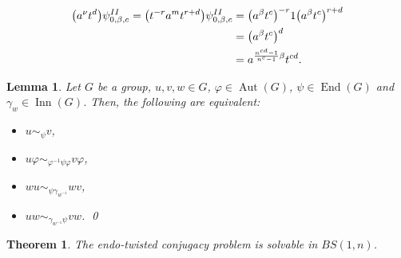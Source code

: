 \documentclass[10pt,a4paper]{amsart}
\newtheorem{lem}{Lemma}
\newtheorem{thm}{Theorem}
\newcommand{\Aut}{\operatorname{Aut}}
\newcommand{\End}{\operatorname{End}}
\newcommand{\Inn}{\operatorname{Inn}}
\begin{document}
  \begin{align}\label{eq: action II}
\big( a^{\nu}t^d \big) \psi^{II}_{0,\beta, c} = \big( t^{-r}a^{m}t^{r+d}\big) \psi^{II}_{0,\beta, c} &= \big( a^{\beta}t^c\big)^{-r} 1 \big( a^{\beta}t^c\big)^{r+d} \notag \\ &= \big( a^{\beta}t^c\big)^d \\ &= a^{\frac{n^{cd}-1}{n^c-1}\beta}t^{cd}. \notag
 \end{align}

\begin{lem} \label{lem: twisted endos}
Let $G$ be a group, $u,v,w \in G$, $\varphi \in \Aut(G)$, $\psi \in \End(G)$ and $\gamma_w \in \Inn(G)$. Then, the following are equivalent:
 \begin{itemize}
\item[(a)] $u \sim_\psi v$,
\item[(b)] $u \varphi \sim_{\varphi^{-1}\psi\varphi} v \varphi$,
\item[(c)] $wu \sim_{\psi\gamma_{w^{-1}}} wv$, 
\item[(d)] $uw \sim_{\gamma_{w^{-1}}\psi} vw$. \hfill \qed
 \end{itemize}
\end{lem}

\begin{thm}\label{thm: main TCP}
The endo-twisted conjugacy problem is solvable in $BS(1,n)$.
\end{thm}
\end{document}
